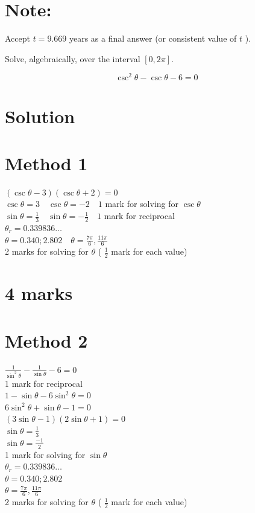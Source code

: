 \documentclass[10pt]{article}
\begin{document}
\section*{Note:}
Accept $t=9.669$ years as a final answer (or consistent value of $t$ ).

Solve, algebraically, over the interval $[0,2 \pi]$.

$$
\csc ^{2} \theta-\csc \theta-6=0
$$

\section*{Solution}
\section*{Method 1}
$(\csc \theta-3)(\csc \theta+2)=0$\\
$\csc \theta=3 \quad \csc \theta=-2 \quad 1$ mark for solving for $\csc \theta$\\
$\sin \theta=\frac{1}{3} \quad \sin \theta=-\frac{1}{2} \quad 1$ mark for reciprocal\\
$\theta_{r}=0.339836 \ldots$\\
$\theta=0.340 ; 2.802 \quad \theta=\frac{7 \pi}{6}, \frac{11 \pi}{6}$\\
2 marks for solving for $\theta$ ( $\frac{1}{2}$ mark for each value)

\section*{4 marks}
\section*{Method 2}
$\frac{1}{\sin ^{2} \theta}-\frac{1}{\sin \theta}-6=0$\\
1 mark for reciprocal\\
$1-\sin \theta-6 \sin ^{2} \theta=0$\\
$6 \sin ^{2} \theta+\sin \theta-1=0$\\
$(3 \sin \theta-1)(2 \sin \theta+1)=0$\\
$\sin \theta=\frac{1}{3}$\\
$\sin \theta=\frac{-1}{2}$\\
1 mark for solving for $\sin \theta$\\
$\theta_{r}=0.339836 \ldots$\\
$\theta=0.340 ; 2.802$\\
$\theta=\frac{7 \pi}{6}, \frac{11 \pi}{6}$\\
2 marks for solving for $\theta$ ( $\frac{1}{2}$ mark for each value)
\end{document}
